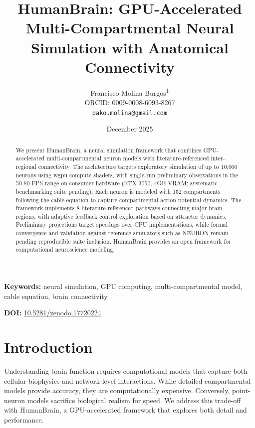 \documentclass[11pt,twocolumn]{article}
\title{HumanBrain: GPU-Accelerated Multi-Compartmental Neural Simulation with Anatomical Connectivity}
\author{
    Francisco Molina Burgos\textsuperscript{1}\\
    \small ORCID: 0009-0008-6093-8267\\
    \small \texttt{pako.molina@gmail.com}
}
\date{December 2025}
\begin{document}
\maketitle

\begin{abstract}
We present HumanBrain, a neural simulation framework that combines GPU-accelerated multi-compartmental neuron models with literature-referenced inter-regional connectivity. The architecture targets exploratory simulation of up to 10,000 neurons using wgpu compute shaders, with single-run preliminary observations in the 50-80 FPS range on consumer hardware (RTX 3050, 4GB VRAM; systematic benchmarking suite pending). Each neuron is modeled with 152 compartments following the cable equation to capture compartmental action potential dynamics. The framework implements 8 literature-referenced pathways connecting major brain regions, with adaptive feedback control exploration based on attractor dynamics. Preliminary projections target speedups over CPU implementations, while formal convergence and validation against reference simulators such as NEURON remain pending reproducible suite inclusion. HumanBrain provides an open framework for computational neuroscience modeling.
\end{abstract}

\textbf{Keywords:} neural simulation, GPU computing, multi-compartmental model, cable equation, brain connectivity

\noindent\textbf{DOI:} \href{https://doi.org/10.5281/zenodo.17720224}{10.5281/zenodo.17720224}

\section{Introduction}

Understanding brain function requires computational models that capture both cellular biophysics and network-level interactions. While detailed compartmental models provide accuracy, they are computationally expensive. Conversely, point-neuron models sacrifice biological realism for speed. We address this trade-off with HumanBrain, a GPU-accelerated framework that explores both detail and performance.
\end{document}
